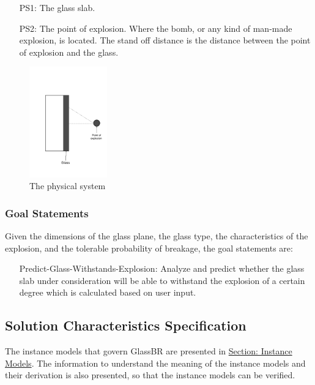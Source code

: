 \documentclass[12pt]{article}
\begin{document}
\begin{itemize}
\item[PS1:]{The glass slab.}
\item[PS2:]{The point of explosion. Where the bomb, or any kind of man-made explosion, is located. The stand off distance is the distance between the point of explosion and the glass.}
\end{itemize}
\begin{figure}
\begin{center}
\includegraphics[width=0.3\textwidth]{../../../datafiles/GlassBR/physicalsystimage.png}
\caption{The physical system}
\label{Figure:physSystImage}
\end{center}
\end{figure}
\subsubsection{Goal Statements}
\label{Sec:GoalStmt}
Given the dimensions of the glass plane, the glass type, the characteristics of the explosion, and the tolerable probability of breakage, the goal statements are:

\begin{itemize}
\item[Predict-Glass-Withstands-Explosion:\phantomsection\label{willBreakGS}]{Analyze and predict whether the glass slab under consideration will be able to withstand the explosion of a certain degree which is calculated based on user input.}
\end{itemize}
\subsection{Solution Characteristics Specification}
\label{Sec:SolCharSpec}
The instance models that govern GlassBR are presented in \hyperref[Sec:IMs]{Section: Instance Models}. The information to understand the meaning of the instance models and their derivation is also presented, so that the instance models can be verified.
\end{document}
